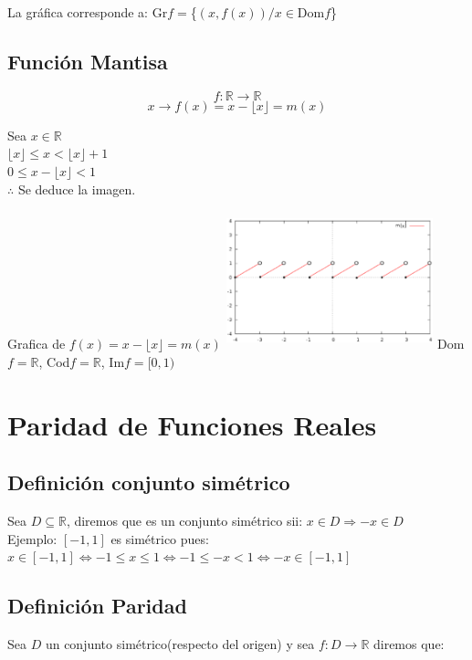 La gráfica corresponde a: Gr$f=$\{$(x,f(x))/ x \in $Dom$f$\}

\subsection{Función Mantisa}
\hfill
\begin{minipage}{.45\textwidth}
$$f: \mathbb{R} \longrightarrow \mathbb{R}$$
$$x \longrightarrow f(x) = x - \lfloor x \rfloor = m(x)$$
\begin{center}
Sea $x \in \mathbb{R}$\\
$\lfloor x \rfloor \leqslant x < \lfloor x \rfloor +1$\\
$0\leqslant x -\lfloor x \rfloor < 1$\\
$\therefore$ Se deduce la imagen.
\end{center}
\end{minipage}
\hfill
\begin{minipage}{.45\textwidth}
\begin{center}
Grafica de $f(x)= x-\lfloor x \rfloor =m(x)$
\includegraphics[height=4cm,width=6cm]{fmatis.eps} 
Dom$f = \mathbb{R}$, Cod$f = \mathbb{R}$, Im$f = [0,1)$\\
\end{center}
\end{minipage}
\hfill

\section{Paridad de Funciones Reales}
\subsection{Definición conjunto simétrico}
	Sea $D \subseteq \mathbb{R}$, diremos que es un conjunto simétrico sii: $x \in D \Rightarrow -x \in D$\\
	Ejemplo: $[-1,1]$ es simétrico pues: 
	$x \in [-1,1] \Leftrightarrow -1 \leqslant x \leqslant 1 \Leftrightarrow 
	-1 \leqslant -x < 1 \Leftrightarrow -x \in [-1,1]$
\subsection{Definición Paridad}
Sea $D$ un conjunto simétrico(respecto del origen) y sea $f:D \longrightarrow \mathbb{R}$ diremos que:
